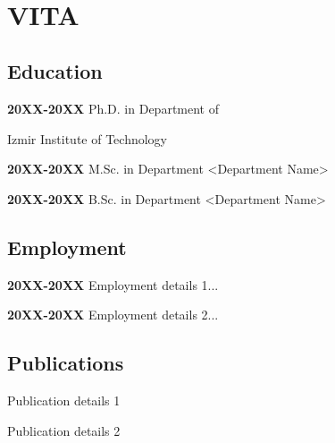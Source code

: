 ~\pagebreak
\chapter*{VITA}
\section*{\AuthorName{ }\MakeUppercase\AuthorSurname}

\section*{Education}
\begin{compactitem}
    \renewcommand\labelitemi{---}
    \item   \textbf{20XX-20XX} Ph.D. in Department of \DepartmentName
    \item[] Izmir Institute of Technology
    
    \item   \textbf{20XX-20XX} M.Sc. in Department <Department Name>
    \item[] <University Name>
    
    \item   \textbf{20XX-20XX} B.Sc. in Department <Department Name>
    \item[] <University Name>
\end{compactitem}

\section*{Employment}
\begin{compactitem}
    \renewcommand\labelitemi{---}
    \item   \textbf{20XX-20XX} Employment details 1...
	\item   \textbf{20XX-20XX} Employment details 2...
\end{compactitem}

\section*{Publications}
\begin{compactitem}
    \renewcommand\labelitemi{---}
    \item   Publication details 1
    
    \item   Publication details 2
	
\end{compactitem}
~\pagebreak
